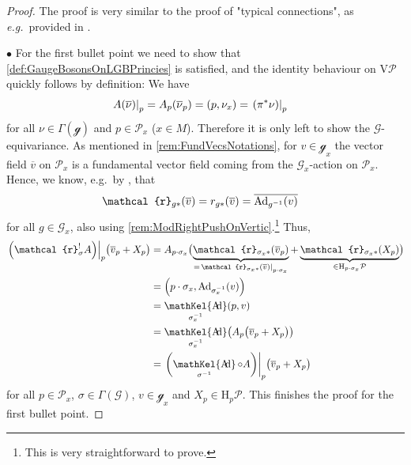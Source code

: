 \documentclass[reqno,a4paper,oneside]{amsart}
\theoremstyle{plain}
\theoremstyle{remark}
\theoremstyle{definition}
\DeclareMathOperator{\sAd}{\mathKel{A\mkern-5.5mu d}}
\begin{document}
\begin{proof}
\leavevmode\newline
The proof is very similar to the proof of "typical connections", as \textit{e.g.}\ provided in \cite[\S 5.2, Thm.\ 5.2.2, page 262]{Hamilton}.

$\bullet$ For the first bullet point we need to show that \ref{def:GaugeBosonsOnLGBPrincies} is satisfied, and the identity behaviour on $\mathrm{V}\mathcal{P}$ quickly follows by definition: We have
\begin{align*}
\mleft.A\mleft( \overline{\nu} \mright)\mright|_{p}
&=
A_p\mleft( \overline{\nu}_p \mright)
=
(p, \nu_x)
=
\mleft.\mleft(\pi^*\nu\mright)\mright|_p
\end{align*}
for all $\nu \in \Gamma(\mathcal{g})$ and $p \in \mathcal{P}_x$ ($x \in M$). Therefore it is only left to show the $\mathcal{G}$-equivariance. As mentioned in \ref{rem:FundVecsNotations}, for $v\in \mathcal{g}_x$ the vector field $\overline{v}$ on $\mathcal{P}_x$ is a fundamental vector field coming from the $\mathcal{G}_x$-action on $\mathcal{P}_x$. Hence, we know, e.g.\ by \cite[\S 3.4, Prop.\ 3.4.6, page 145f.]{Hamilton}, that
\begin{align*}
\mathcal{r}_{g*}\mleft( \overline{v} \mright)
&=
r_{g*}\mleft( \overline{v} \mright)
=
\overline{\mathrm{Ad}_{g^{-1}}(v)}
\end{align*}
for all $g \in \mathcal{G}_x$, also using \ref{rem:ModRightPushOnVertic}.\footnote{This is very straightforward to prove.} Thus,
\begin{align*}
\mleft.\mleft(\mathcal{r}^!_\sigma A\mright)\mright|_p\bigl( \overline{v}_p + X_p \bigr)
&=
A_{p \cdot \sigma_x}\bigl( 
	\underbrace{\mathcal{r}_{\sigma_x*}\mleft(\overline{v}_p\mright)}
		_{= \mleft. \mathcal{r}_{\sigma_x*}\mleft( \overline{v} \mright) \mright|_{p \cdot  \sigma_x}}
	+ \underbrace{\mathcal{r}_{\sigma_x*}(X_p) }_{\in \mathrm{H}_{p \cdot \sigma_x}\mathcal{P}}
\bigr)
\\
&=
\mleft( p \cdot \sigma_x, \mathrm{Ad}_{\sigma_x^{-1}}(v) \mright)
\\
&=
\sAd_{\sigma_x^{-1}}(p, v)
\\
&=
\sAd_{\sigma_x^{-1}}\mleft(A_p\bigl( \overline{v}_p + X_p \bigr)\mright)
\\
&=
\mleft.\mleft(\sAd_{\sigma^{-1}} \circ A\mright)\mright|_p \bigl( \overline{v}_p + X_p \bigr)
\end{align*}
for all $p \in \mathcal{P}_x$, $\sigma \in \Gamma(\mathcal{G})$, $v \in \mathcal{g}_x$ and $X_p \in \mathrm{H}_p\mathcal{P}$. This finishes the proof for the first bullet point.


\end{proof}
\end{document}
